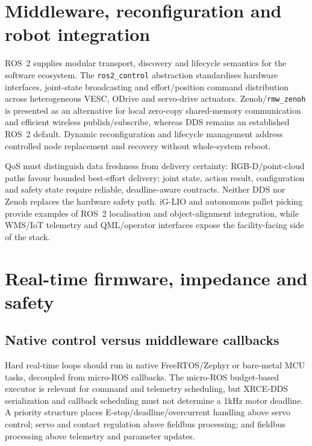 \documentclass[10pt,a4paper]{article}
\begin{document}
\section{Middleware, reconfiguration and robot integration}
ROS~2 supplies modular transport, discovery and lifecycle semantics for the software ecosystem. The \texttt{ros2\_control} abstraction standardises hardware interfaces, joint-state broadcasting and effort/position command distribution across heterogeneous VESC, ODrive and servo-drive actuators. Zenoh/\texttt{rmw\_zenoh} is presented as an alternative for local zero-copy shared-memory communication and efficient wireless publish/subscribe, whereas DDS remains an established ROS~2 default. Dynamic reconfiguration and lifecycle management address controlled node replacement and recovery without whole-system reboot.\cite{peldszus}

QoS must distinguish data freshness from delivery certainty: RGB-D/point-cloud paths favour bounded best-effort delivery; joint state, action result, configuration and safety state require reliable, deadline-aware contracts. Neither DDS nor Zenoh replaces the hardware safety path. iG-LIO and autonomous pallet picking provide examples of ROS~2 localisation and object-alignment integration, while WMS/IoT telemetry and QML/operator interfaces expose the facility-facing side of the stack.\cite{iglio,mokk}

\section{Real-time firmware, impedance and safety}
\subsection{Native control versus middleware callbacks}
Hard real-time loops should run in native FreeRTOS/Zephyr or bare-metal MCU tasks, decoupled from micro-ROS callbacks. The micro-ROS budget-based executor is relevant for command and telemetry scheduling, but XRCE-DDS serialization and callback scheduling must not determine a 1kHz motor deadline.\cite{micro} A priority structure places E-stop/deadline/overcurrent handling above servo control; servo and contact regulation above fieldbus processing; and fieldbus processing above telemetry and parameter updates.
\end{document}

